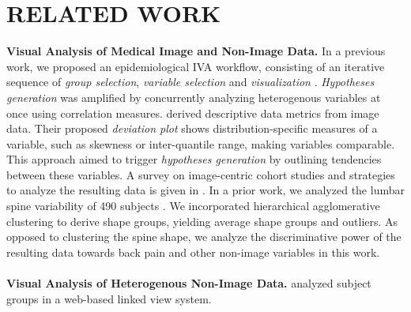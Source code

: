 \documentclass[a4paper,twoside]{style/article}
\begin{document}
\section{\uppercase{Related Work}}
\label{sec:RelatedWork}
\noindent \textbf{Visual Analysis of Medical Image and Non-Image Data.}
In a previous work, we proposed an epidemiological IVA workflow, consisting of an iterative sequence of \emph{group selection}, \emph{variable selection} and \emph{visualization} \cite{Klemm2014VIS}.
\emph{Hypotheses generation} was amplified by concurrently analyzing heterogenous variables at once using correlation measures.
\cite{Turkay} derived descriptive data metrics from image data.
Their proposed \emph{deviation plot} shows distribution-specific measures of a variable, such as skewness or inter-quantile range, making variables comparable.
This approach aimed to trigger \emph{hypotheses generation} by outlining tendencies between these variables.
A survey on image-centric cohort studies and strategies to analyze the resulting data is given in \cite{Preim2015}.
In a prior work, we analyzed the lumbar spine variability of 490 subjects \cite{Klemm2013VMV}.
We incorporated hierarchical agglomerative clustering to derive shape groups, yielding average shape groups and outliers.
As opposed to clustering the spine shape, we analyze the discriminative power of the resulting data towards back pain and other non-image variables in this work.
\\\\
\noindent \textbf{Visual Analysis of Heterogenous Non-Image Data.}
\cite{Zhang} analyzed subject groups in a web-based linked view system.
\end{document}
